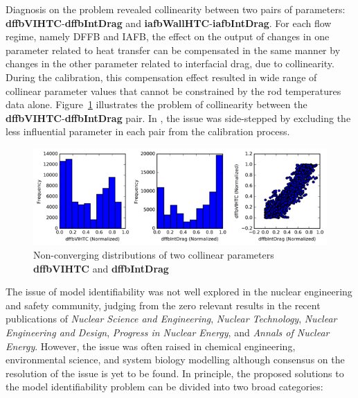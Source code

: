 \documentclass[11pt,titlepage]{article}
\begin{document}
Diagnosis on the problem revealed collinearity between two pairs of 
parameters: \textbf{dffbVIHTC}-\textbf{dffbIntDrag} and 
\textbf{iafbWallHTC}-\textbf{iafbIntDrag}. 
For each flow regime, namely DFFB and IAFB, 
the effect on the output of changes in one parameter 
related to heat transfer can be compensated in the same manner 
by changes in the other parameter related to interfacial drag, due to 
collinearity. 
During the calibration, this compensation effect resulted in wide range of 
collinear parameter values that cannot be constrained by the rod temperatures 
data alone. 
Figure~\ref{fig:collinear} illustrates the problem of collinearity between the 
\textbf{dffbVIHTC}-\textbf{dffbIntDrag} pair. 
In \cite{Wicaksono2016}, the issue was side-stepped by excluding the less 
influential parameter in each pair from the calibration process.

\begin{figure}[h!]
	\centering
	\includegraphics[scale=0.90]{figures/collinear.png}
	\caption{Non-converging distributions of two collinear parameters
	    \textbf{dffbVIHTC} and \textbf{dffbIntDrag}}
	\label{fig:collinear}
\end{figure}

The issue of model identifiability was not well explored in the nuclear 
engineering and safety community, judging from the zero relevant results 
in the recent publications of \textit{Nuclear Science and Engineering}, 
\textit{Nuclear Technology}, \textit{Nuclear Engineering and Design}, 
\textit{Progress in Nuclear Energy}, and \textit{Annals of Nuclear Energy}. 
However, the issue was often raised in chemical engineering, 
environmental science, and system biology modelling although consensus 
on the resolution of the issue is yet to be found. 
In principle, the proposed solutions to the model identifiability problem 
can be divided into two broad categories:
\end{document}
